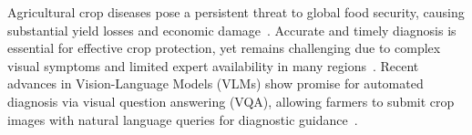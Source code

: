 \documentclass[11pt]{article}
\begin{document}
Agricultural crop diseases pose a persistent threat to global food security, causing substantial yield losses and economic damage~\cite{savary2020modeling,gai2024plant,shahbazi2025losses}. Accurate and timely diagnosis is essential for effective crop protection, yet remains challenging due to complex visual symptoms and limited expert availability in many regions~\cite{upadhyay2025deep,ngugi2024revolutionizing,buja2021advances,mohanty2016using}. Recent advances in Vision-Language Models (VLMs) show promise for automated diagnosis via visual question answering (VQA), allowing farmers to submit crop images with natural language queries for diagnostic guidance~\cite{lu2024application,sapkota2025multi}.


\end{document}
